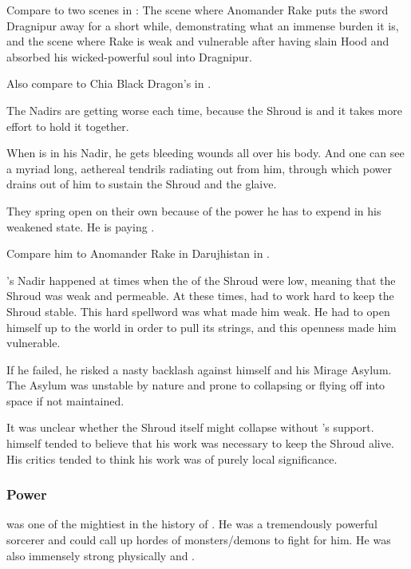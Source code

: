 Compare to two scenes in \cite{StevenErikson:TolltheHounds}:
The scene where Anomander Rake puts the sword Dragnipur away for a short while, demonstrating what an immense burden it is, and the scene where Rake is weak and vulnerable after having slain Hood and absorbed his wicked-powerful soul into Dragnipur. 

Also compare to Chia Black Dragon's  in \cite{StephenMarley:SpiritMirror}. 

The Nadirs are getting worse each time, because the Shroud is  and it takes more effort to hold it together. 

When \Ishnaruchaefir is in his Nadir, he gets bleeding wounds all over his body. 
And one can see a myriad long, aethereal tendrils radiating out from him, through which power drains out of him to sustain the Shroud and the glaive. 

They spring open on their own because of the power he has to expend in his weakened state.
He is paying .
 
Compare him to Anomander Rake in Darujhistan in \cite{StevenErikson:TolltheHounds}. 

\Ishnaruchaefir's Nadir happened at times when the  of the Shroud were low, meaning that the Shroud was weak and permeable. 
At these times, \Ishnaruchaefir had to work hard to keep the Shroud stable. 
This hard spellword was what made him weak. 
He had to open himself up to the world in order to pull its strings, and this openness made him vulnerable. 

If he failed, he risked a nasty backlash against himself and his Mirage Asylum. 
The Asylum was unstable by nature and prone to collapsing or flying off into space if not maintained. 

It was unclear whether the Shroud itself might collapse without \Ishnaruchaefir's support. 
\Ishnaruchaefir himself tended to believe that his work was necessary to keep the Shroud alive.
His critics tended to think his work was of purely local significance. 







\subsubsection{Power}
\Ishnaruchaefir was one of the mightiest \dragons in the history of \Miith. 
He was a tremendously powerful sorcerer and could call up hordes of monsters/demons to fight for him. 
He was also immensely strong physically and . 

